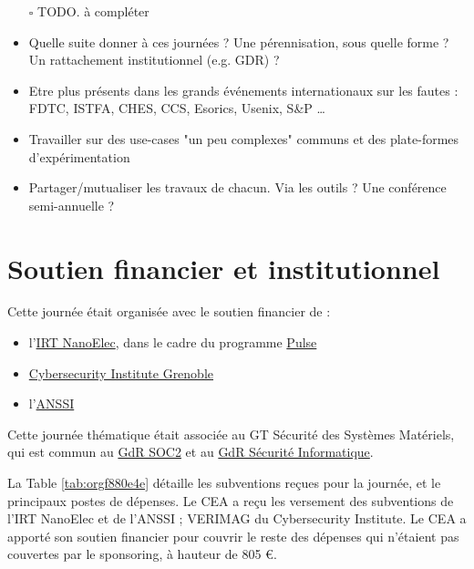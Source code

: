\documentclass[a4paper,11pt]{article}
\begin{document}
\begin{itemize}
\item[{$\square$}] TODO.  à compléter

\item Quelle suite donner à ces journées ?  Une pérennisation, sous quelle
forme ?  Un rattachement institutionnel (e.g. GDR) ?
\item Etre plus présents dans les grands événements internationaux sur les
fautes : FDTC, ISTFA, CHES, CCS, Esorics, Usenix, S\&P …
\item Travailler sur des use-cases "un peu complexes" communs et des
plate-formes d’expérimentation
\item Partager/mutualiser les travaux de chacun. Via les outils ? Une
conférence semi-annuelle ?
\end{itemize}



\section{Soutien financier et institutionnel}
\label{sec:orgfe2cee2}

Cette journée était organisée avec le soutien financier de :

\begin{itemize}
\item l'\href{http://www.irtnanoelec.fr}{IRT NanoElec}, dans le cadre du programme \href{http://www.irtnanoelec.fr/technologies-de-liaison}{Pulse}
\item \href{https://cybersecurity.univ-grenoble-alpes.fr/}{Cybersecurity Institute Grenoble}
\item l'\href{https://www.ssi.gouv.fr}{ANSSI}
\end{itemize}

Cette journée thématique était associée au GT Sécurité des Systèmes
Matériels, qui est commun au \href{http://www.gdr-soc.cnrs.fr}{GdR SOC2} et au \href{https://gdr-securite.irisa.fr}{GdR Sécurité Informatique}.

La Table \ref{tab:orgf880e4e} détaille les subventions reçues pour la journée,
et le principaux postes de dépenses.
Le CEA a reçu les versement des subventions de l'IRT NanoElec et de
l'ANSSI ; VERIMAG du Cybersecurity Institute.  Le CEA a apporté son
soutien financier pour couvrir le reste des dépenses qui n'étaient pas
couvertes par le sponsoring, à hauteur de 805 €.
\end{document}
